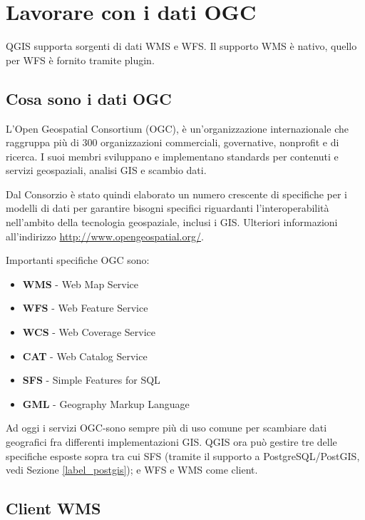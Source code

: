 
\section{Lavorare con i dati OGC}


QGIS supporta sorgenti di dati WMS e WFS. Il supporto WMS è nativo, quello per
WFS è fornito tramite plugin.

\subsection{Cosa sono i dati OGC}

L'Open Geospatial Consortium (OGC), è un’organizzazione internazionale che raggruppa più
di 300 organizzazioni commerciali, governative, nonprofit e di ricerca.
I suoi membri sviluppano e implementano standards per contenuti e servizi geospaziali,
analisi GIS e scambio dati.

Dal Consorzio è stato quindi elaborato un numero crescente di specifiche per i modelli di
dati per garantire bisogni specifici riguardanti l'interoperabilità
nell'ambito della tecnologia geospaziale, inclusi i GIS. Ulteriori
informazioni all'indirizzo \url{http://www.opengeospatial.org/}.

Importanti specifiche OGC sono:

\begin{itemize}
\item \textbf{WMS} - Web Map Service
\item \textbf{WFS} - Web Feature Service
\item \textbf{WCS} - Web Coverage Service
\item \textbf{CAT} - Web Catalog Service
\item \textbf{SFS} - Simple Features for SQL
\item \textbf{GML} - Geography Markup Language
\end{itemize}

Ad oggi i servizi OGC-sono sempre più di uso comune per scambiare dati geografici fra
differenti implementazioni GIS. QGIS ora può gestire tre delle specifiche esposte sopra
tra cui SFS (tramite il supporto a PostgreSQL/PostGIS, vedi Sezione
\ref{label_postgis}); e WFS e WMS come client.


\subsection{Client WMS}\label{sec:ogc-wms}

